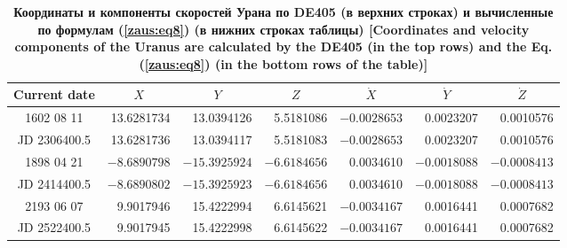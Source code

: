 \begin{table}
\begin{minipage}[t]{160mm}
\caption{\bf Координаты и компоненты скоростей Урана по DE405 (в верхних строках) и вычисленные по формулам  (\ref{zaus:eq8}) (в нижних строках таблицы) [Coordinates and velocity components of the Uranus are calculated by the  DE405 (in the top rows) and the Eq. (\ref{zaus:eq8}) (in the bottom rows of the table)]
\vspace{-3mm}}
\begin{tabular}{|c|r|r|r|r|r|r|}
\hline
\footnotesize
\rule{0mm}{12pt}%
Current date & \multicolumn{1}{c|}{\footnotesize $X$}&	\multicolumn{1}{c|}{\footnotesize $Y$}&	\multicolumn{1}{c|}{\footnotesize $Z$}&	\multicolumn{1}{c|}{\footnotesize $\dot{X}$}&	\multicolumn{1}{c|}{\footnotesize $\dot{Y}$}&	\multicolumn{1}{c|}{\footnotesize$\dot{Z}$}\\ \hline
\rule{0mm}{14pt}%
1602 08 11&	13.6281734&	13.0394126&	5.5181086&	$-0.0028653$&	0.0023207&	  0.0010576\\
JD 2306400.5&	13.6281736&	13.0394117&	5.5181083&	$-0.0028653$&	0.0023207&	  0.0010576\\ \hline
1898 04 21&	$-8.6890798$&	$-15.3925924$&	$-6.6184656$&	0.0034610&	$-0.0018088$&	 $-0.0008413$\\
JD 2414400.5&	$-8.6890802$&	$-15.3925923$&	$-6.6184656$&	0.0034610&	$-0.0018088$&	 $-0.0008413$\\ \hline
2193 06 07&	9.9017946&	15.4222994&	6.6145621&	$-0.0034167$&	0.0016441&	 0.0007682\\
JD 2522400.5&	9.9017945&	15.4222998&	6.6145622&	$-0.0034167$&	0.0016441&	 0.0007682\\ \hline
\end{tabular}
\label{table:zausaev:tabl11}

\end{minipage}
\end{table}





